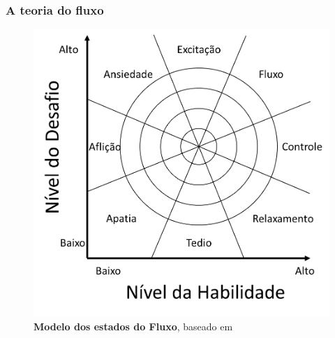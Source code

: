 \expandafter\documentclass\expandafter[table, usenames, svgnames, dvipsnames, \classopts]{beamer}
\begin{document}
\begin{frame}
	\frametitle{\textbf{A teoria do fluxo}}

	\begin{figure}
	    \centering
        \includegraphics[height=0.8\paperheight]{flow-model}
        \caption{\textbf{Modelo dos estados do Fluxo}, baseado em \cite{Nakamura2001}}
    \end{figure}

\end{frame}
\end{document}
